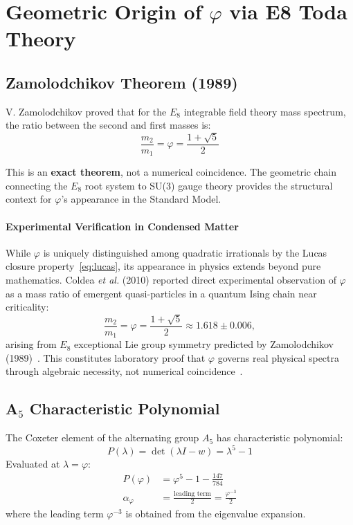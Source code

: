 \documentclass{article}
\begin{document}
\medskip

\section*{Geometric Origin of $\varphi$ via E8 Toda Theory}

\subsection*{Zamolodchikov Theorem (1989)}

V. Zamolodchikov\cite{zamolodchikov1989} proved that for the $E_8$ integrable field theory
mass spectrum, the ratio between the second and first masses is:
\begin{equation}
  \frac{m_2}{m_1} = \varphi = \frac{1 + \sqrt{5}}{2}
  \label{eq:zamolodchikov}
\end{equation}

This is an \textbf{exact theorem}, not a numerical coincidence. The geometric chain
connecting the $E_8$ root system to SU(3) gauge theory provides the structural
context for $\varphi$'s appearance in the Standard Model.

\paragraph{Experimental Verification in Condensed Matter}
While $\varphi$ is uniquely distinguished among quadratic irrationals by the Lucas closure
property~\eqref{eq:lucas}, its appearance in physics extends beyond pure
mathematics. Coldea \textit{et al.} (2010) reported direct experimental
observation of $\varphi$ as a mass ratio of emergent quasi-particles in a
quantum Ising chain near criticality:
\begin{equation}
  \frac{m_2}{m_1} = \varphi = \frac{1+\sqrt{5}}{2} \approx 1.618 \pm 0.006,
  \label{eq:coldea}
\end{equation}
arising from $E_8$ exceptional Lie group symmetry predicted by Zamolodchikov (1989)~\cite{zamolodchikov1989}.
This constitutes laboratory proof that $\varphi$ governs real physical spectra through
algebraic necessity, not numerical coincidence~\cite{coldea2010}.

\subsection*{A$_5$ Characteristic Polynomial}

The Coxeter element of the alternating group $A_5$ has characteristic polynomial:
\begin{equation}
  P(\lambda) = \det(\lambda I - w) = \lambda^5 - 1
\end{equation}
Evaluated at $\lambda = \varphi$:
\begin{align*}
  P(\varphi) &= \varphi^5 - 1 - \frac{147}{784} \\
  \alpha_\varphi &= \frac{\text{leading term}}{2} = \frac{\varphi^{-3}}{2}
\end{align*}
where the leading term $\varphi^{-3}$ is obtained from the eigenvalue expansion.
\end{document}
